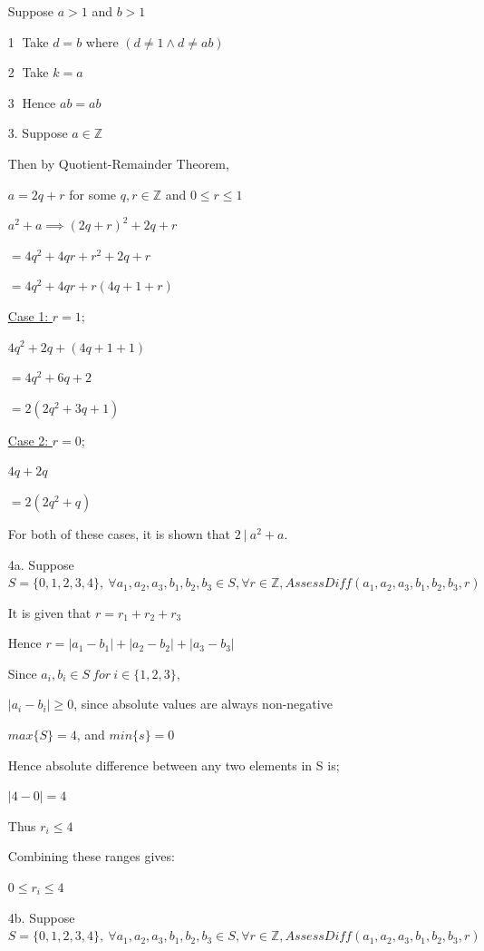 \documentclass[12pt]{article}
\begin{document}
\begin{enumerate}
Suppose $a>1$ and $b>1$

\textcircled{1} Take $d = b$ where $(d\neq1 \land d\neq ab)$

\textcircled{2} Take $k = a$

\textcircled{3} Hence $ab = ab$


\item[3.]
Suppose $a \in \mathbb{Z}$

Then by Quotient-Remainder Theorem,

$a = 2q + r$ for some $q,r \in \mathbb{Z}$ and $0 \leq r \leq 1$

$a^2 + a \implies (2q+r)^2 + 2q +r$

$= 4q^2 +4qr + r^2 + 2q+r$

$= 4q^2 +4qr + r(4q+1+r)$

\underline{Case 1: $r=1$;}

$4q^2 + 2q + (4q+1+1)$

$=4q^2 + 6q +2$

$= 2(2q^2 +3q +1)$

\underline{Case 2: $r=0$;}

$4q + 2q$

$=2(2q^2+q)$

For both of these cases, it is shown that $2 \ | \  a^2 +a$.




\item[4a.]
Suppose $S= \{0,1,2,3,4\}, \ \forall a_1, a_2, a_3, b_1, b_2, b_3 \in S, \forall r \in \mathbb{Z}, \mathit{AssessDiff}(a_1, a_2, a_3, b_1, b_2, b_3, r)$

It is given that $r = r_1 +r_2 + r_3$

Hence $r = |a_1-b_1| + |a_2 - b_2| + |a_3 - b_3|$

Since $a_i, b_i \in S \ for \ i \in \{1,2,3\},$

$|a_i - b_i| \geq 0$, since absolute values are always non-negative

$max\{S\} = 4$, and $min\{s\} = 0$

Hence absolute difference between any two elements in S is;

$|4-0| = 4$

Thus $r_i \leq 4$

Combining these ranges gives:

$0 \leq r_i \leq 4$




\item[4b.]
Suppose $S= \{0,1,2,3,4\}, \ \forall a_1, a_2, a_3, b_1, b_2, b_3 \in S, \forall r \in \mathbb{Z}, \mathit{AssessDiff}(a_1, a_2, a_3, b_1, b_2, b_3, r)$


\end{enumerate}
\end{document}
